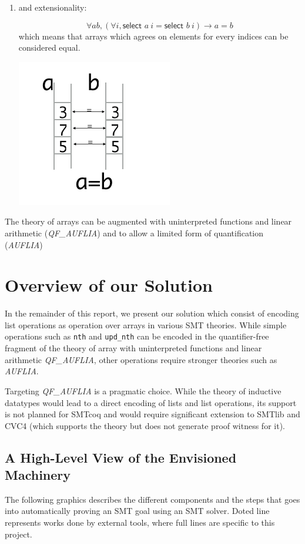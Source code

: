 \documentclass[onecolumn, preprint]{sigplanconf}
\begin{document}
\begin{enumerate}
\item and extensionality:
  
  \begin{multicols}{2}
  $$ \forall a b, (\forall i, \textsf{select } a\ i = \textsf{select } b\ i) \to a = b$$
  which means that arrays which agrees on elements for every indices can be considered equal.

  \includegraphics[scale=0.5]{pictures/axiom3.png}
  \end{multicols}
  \end{enumerate}
  

The theory of arrays can be augmented with uninterpreted functions and linear arithmetic (\emph{QF\_AUFLIA}) and to allow a limited form of quantification (\emph{AUFLIA})



\section{Overview of our Solution}

In the remainder of this report, we present our solution which consist of encoding list operations as operation over arrays in various SMT theories. While simple operations such as \lstinline|nth| and \lstinline|upd_nth| can be encoded in the quantifier-free fragment of the theory of array with uninterpreted functions and linear arithmetic \emph{QF\_AUFLIA}, other operations require stronger theories such as \emph{AUFLIA}. 

Targeting \emph{QF\_AUFLIA} is a pragmatic choice. While the theory of inductive datatypes would lead to a direct encoding of lists and list operations, its support is not planned for SMTcoq and would require significant extension to SMTlib and CVC4 (which supports the theory but does not generate proof witness for it). 

\subsection{A High-Level View of the Envisioned Machinery}
The following graphics describes the different components and the steps that goes into automatically proving an SMT goal using an SMT solver. Doted line represents works done by external tools, where full lines are specific to this project. 
\end{document}
